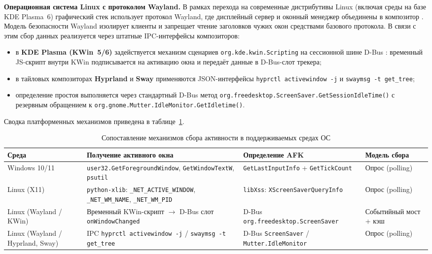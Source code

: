 \documentclass{timcw}
\begin{document}
\textbf{Операционная система Linux с протоколом Wayland.} В рамках перехода на современные дистрибутивы Linux (включая среды на базе KDE Plasma~6) графический стек использует протокол Wayland, где дисплейный сервер и оконный менеджер объединены в композитор \cite{wayland}. Модель безопасности Wayland изолирует клиенты и запрещает чтение заголовков чужих окон средствами базового протокола. В связи с этим сбор данных реализуется через штатные IPC-интерфейсы композиторов:
\begin{itemize}
  \item в \textbf{KDE Plasma (KWin~5/6)} задействуется механизм сценариев \texttt{org.kde.kwin.Scripting} на сессионной шине D-Bus \cite{kwin_scripting}: временный JS-скрипт внутри KWin подписывается на активацию окна и передаёт данные в D-Bus-слот трекера;
  \item в тайловых композиторах \textbf{Hyprland} и \textbf{Sway} применяются JSON-интерфейсы \texttt{hyprctl activewindow -j} и \texttt{swaymsg -t get\_tree};
  \item определение простоя выполняется через стандартный D-Bus метод \texttt{org.freedesktop.ScreenSaver.GetSessionIdleTime()} \cite{dbus_spec} с резервным обращением к \texttt{org.gnome.Mutter.IdleMonitor.GetIdletime()}.
\end{itemize}

Сводка платформенных механизмов приведена в таблице~\ref{tab:os_mechanisms}.

\begin{table}[H]
\centering
\caption{Сопоставление механизмов сбора активности в поддерживаемых средах ОС}
\label{tab:os_mechanisms}
\footnotesize
\begin{tabularx}{\textwidth}{>{\raggedright\arraybackslash}p{2.8cm} >{\raggedright\arraybackslash}X >{\raggedright\arraybackslash}X >{\centering\arraybackslash}p{2.2cm}}
\toprule
\textbf{Среда} & \textbf{Получение активного окна} & \textbf{Определение AFK} & \textbf{Модель сбора} \\
\midrule
Windows 10/11 & \texttt{user32.GetForegroundWindow}, \texttt{GetWindowTextW}, \texttt{psutil} & \texttt{GetLastInputInfo} + \texttt{GetTickCount} & Опрос (polling) \\
\addlinespace
Linux (X11) & \texttt{python-xlib}: \texttt{\_NET\_ACTIVE\_WINDOW}, \texttt{\_NET\_WM\_NAME}, \texttt{\_NET\_WM\_PID} & \texttt{libXss}: \texttt{XScreenSaverQueryInfo} & Опрос (polling) \\
\addlinespace
Linux (Wayland / KWin) & Временный KWin-скрипт $\rightarrow$ D-Bus слот \texttt{onWindowChanged} & D-Bus \texttt{org.freedesktop.ScreenSaver} & Событийный мост + кэш \\
\addlinespace
Linux (Wayland / Hyprland, Sway) & IPC \texttt{hyprctl activewindow -j} / \texttt{swaymsg -t get\_tree} & D-Bus \texttt{ScreenSaver} / \texttt{Mutter.IdleMonitor} & Опрос (polling) \\
\bottomrule
\end{tabularx}
\end{table}
\end{document}
